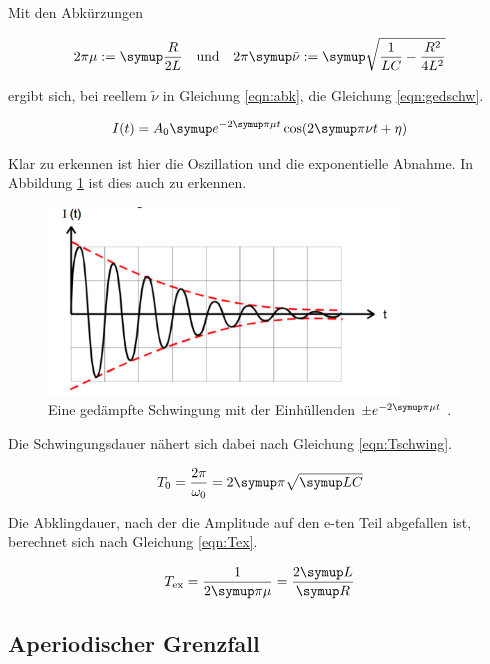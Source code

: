 Mit den Abkürzungen

\begin{align}
  2 \pi \mu := \g{\frac{R}{2 L}} \quad \text{und} \quad 2 \pi \g{\tilde{\nu}} := \g{\sqrt{\frac{1}{L C} - \frac{R^2}{4 L^2}}}
  \label{eqn:abk}
\end{align}

ergibt sich, bei reellem $\tilde{\nu}$ in Gleichung \eqref{eqn:abk}, die Gleichung \eqref{eqn:gedschw}.

\begin{equation}
  I(t) = A_0 \g{e}^{-2 \g{\pi} \mu t} \cos(2 \g{\pi} \nu t + \eta)
  \label{eqn:gedschw}
\end{equation}

Klar zu erkennen ist hier die Oszillation und die exponentielle Abnahme.
In Abbildung \ref{fig:gedschw} ist dies auch zu erkennen.

\begin{figure}[h]
  \centering
  \includegraphics[height = 5cm]{gedschw.pdf}
  \caption{Eine gedämpfte Schwingung mit der Einhüllenden $\pm e^{-2\g{\pi}\mu t}$ \cite{anleitung}.}
  \label{fig:gedschw}
\end{figure}

Die Schwingungsdauer nähert sich dabei nach Gleichung \eqref{eqn:Tschwing}.

\begin{equation}
  T_{\text{0}} = \frac{2 \pi}{\omega_0} = 2 \g{\pi}\sqrt{\g{LC}}
  \label{eqn:Tschwing}
\end{equation}

Die Abklingdauer, nach der die Amplitude auf den e-ten Teil abgefallen ist,
berechnet sich nach Gleichung \eqref{eqn:Tex}.

\begin{equation}
  T_{\text{ex}} = \frac{1}{2\g{\pi}\mu} = \frac{2\g{L}}{\g{R}}
  \label{eqn:Tex}
\end{equation}

\subsection{Aperiodischer Grenzfall}

